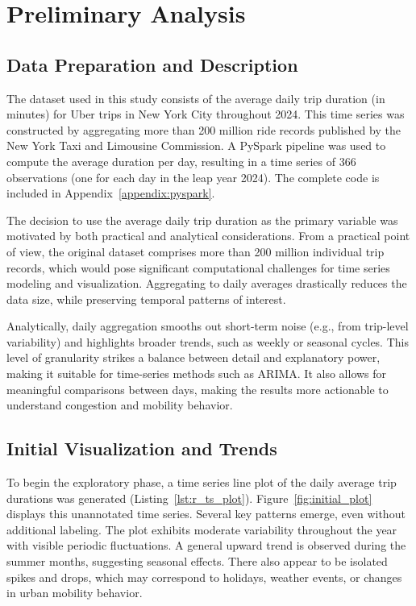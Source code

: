 \documentclass{article}
\begin{document}
\section{Preliminary Analysis}

\subsection{Data Preparation and Description}
The dataset used in this study consists of the average daily trip duration (in minutes) for Uber trips in New York City throughout 2024. This time series was constructed by aggregating more than 200 million ride records published by the New York Taxi and Limousine Commission. A PySpark pipeline was used to compute the average duration per day, resulting in a time series of 366 observations (one for each day in the leap year 2024). The complete code is included in Appendix~\ref{appendix:pyspark}.

The decision to use the average daily trip duration as the primary variable was motivated by both practical and analytical considerations. From a practical point of view, the original dataset comprises more than 200 million individual trip records, which would pose significant computational challenges for time series modeling and visualization. Aggregating to daily averages drastically reduces the data size, while preserving temporal patterns of interest. 

Analytically, daily aggregation smooths out short-term noise (e.g., from trip-level variability) and highlights broader trends, such as weekly or seasonal cycles. This level of granularity strikes a balance between detail and explanatory power, making it suitable for time-series methods such as ARIMA. It also allows for meaningful comparisons between days, making the results more actionable to understand congestion and mobility behavior.


\subsection{Initial Visualization and Trends}
To begin the exploratory phase, a time series line plot of the daily average trip durations was generated (Listing~\ref{lst:r_ts_plot}). Figure~\ref{fig:initial_plot} displays this unannotated time series. Several key patterns emerge, even without additional labeling. The plot exhibits moderate variability throughout the year with visible periodic fluctuations. A general upward trend is observed during the summer months, suggesting seasonal effects. There also appear to be isolated spikes and drops, which may correspond to holidays, weather events, or changes in urban mobility behavior.
\end{document}
